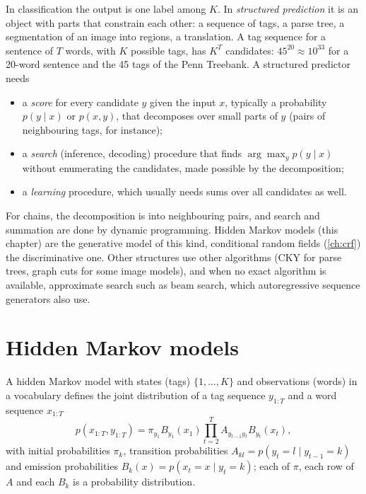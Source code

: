 \begin{notechapter}
In classification the output is one label among $K$. In \emph{structured prediction} it is an object
with parts that constrain each other: a sequence of tags, a parse tree, a segmentation of an
image into regions, a translation. A tag sequence for a sentence of $T$ words, with $K$ possible tags,
has $K^T$ candidates: $45^{20}\approx10^{33}$ for a 20-word sentence and the 45 tags of the Penn Treebank. A
structured predictor needs
\begin{itemize}[nosep]
  \item a \emph{score} for every candidate $y$ given the input $x$, typically a probability $p(y\mid x)$ or $p(x, y)$, that
        decomposes over small parts of $y$ (pairs of neighbouring tags, for instance);
  \item a \emph{search} (inference, decoding) procedure that finds $\arg\max_yp(y\mid x)$ without enumerating the
        candidates, made possible by the decomposition;
  \item a \emph{learning} procedure, which usually needs sums over all candidates as well.
\end{itemize}
For chains, the decomposition is into neighbouring pairs, and search and summation are
done by dynamic programming. Hidden Markov models (this chapter) are the generative
model of this kind, conditional random fields (\cref{ch:crf}) the discriminative one. Other
structures use other algorithms (CKY for parse trees, graph cuts for some image models),
and when no exact algorithm is available, approximate search such as beam search, which
autoregressive sequence generators also use.

\section{Hidden Markov models}\label{hmm-viterbi:sec:hmm}

\begin{definition}\label{hmm-viterbi:def:hmm}
A hidden Markov model with states (tags) $\{1,\dots,K\}$ and observations (words) in a vocabulary defines the
joint distribution of a tag sequence $y_{1:T}$ and a word sequence $x_{1:T}$
\[
  p(x_{1:T}, y_{1:T}) = \pi_{y_1}B_{y_1}(x_1)\prod_{t=2}^TA_{y_{t-1}y_t}B_{y_t}(x_t),
\]
with initial probabilities $\pi_k$, transition probabilities $A_{kl} = p(y_t = l\mid y_{t-1} = k)$ and emission probabilities
$B_k(x) = p(x_t = x\mid y_t = k)$; each of $\pi$, each row of $A$ and each $B_k$ is a probability distribution.
\end{definition}


\end{notechapter}
